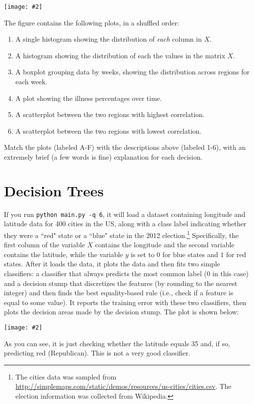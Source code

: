\documentclass{article}
\def\blu#1{{\color{blu}#1}}
\newcommand{\fig}[2]{\texttt{[image: \#2]}}
\newcommand{\centerfig}[2]{\begin{center}\texttt{[image: \#2]}\end{center}}
\def\enum#1{\begin{enumerate}#1\end{enumerate}}
\begin{document}
	\fig{1}{./figs/visualize-unlabeled}

	The figure contains the following plots, in a shuffled order:
	\enum{
		\item A single histogram showing the distribution of \emph{each} column in $X$.
		\item A histogram showing the distribution of each the values in the matrix $X$.
		\item A boxplot grouping data by weeks, showing the distribution across regions for each week.
		\item A plot showing the illness percentages over time.
		\item A scatterplot between the two regions with highest correlation.
		\item A scatterplot between the two regions with lowest correlation.
	}

	\blu{Match the plots (labeled A-F) with the descriptions above (labeled 1-6), with an extremely brief (a few words is fine) explanation for each decision.}




	\section{Decision Trees}

	If you run \texttt{python main.py -q 6}, it will load a dataset containing longitude
	and latitude data for 400 cities in the US, along with a class label indicating
	whether they were a ``red" state or a ``blue" state in the 2012
	election.\footnote{The cities data was sampled from \url{http://simplemaps.com/static/demos/resources/us-cities/cities.csv}. The election information was collected from Wikipedia.}
	Specifically, the first column of the variable $X$ contains the
	longitude and the second variable contains the latitude,
	while the variable $y$ is set to $0$ for blue states and $1$ for red states.
	After it loads the data, it plots the data and then fits two simple
	classifiers: a classifier that always predicts the
	most common label ($0$ in this case) and a decision stump
	that discretizes the features (by rounding to the nearest integer)
	and then finds the best equality-based rule (i.e., check
	if a feature is equal to some value).
	It reports the training error with these two classifiers, then plots the decision areas made by the decision stump.
	The plot is shown below:

	\centerfig{0.7}{./figs/q6_decisionBoundary}

	As you can see, it is just checking whether the latitude equals 35 and, if so, predicting red (Republican).
	This is not a very good classifier.
\end{document}
